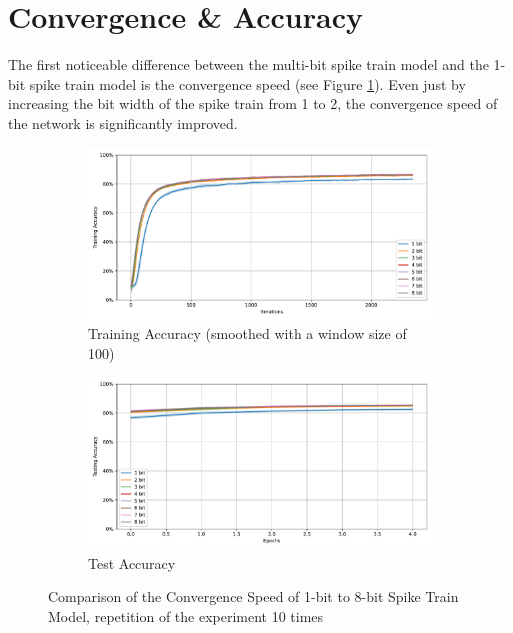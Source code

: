 
    \section{Convergence \& Accuracy}
    \label{sec:convergence_accuracy}
        The first noticeable difference between the multi-bit spike train model and the 1-bit spike train model is the convergence speed (see Figure \ref{fig:convergence_speed}). Even just by increasing the bit width of the spike train from 1 to 2, the convergence speed of the network is significantly improved. 
        \begin{figure}[!htpb]
            \centering
            \begin{subfigure}[H]{\textwidth}
                \centering
                \includegraphics[width=\textwidth]{../standard/FashionMNIST/plots/fashionmnist_train_acc.pdf}
                \caption{Training Accuracy (smoothed with a window size of 100)}
            \end{subfigure}
            \hfill
            \begin{subfigure}[H]{\textwidth}
                \centering
                \includegraphics[width=\textwidth]{../standard/FashionMNIST/plots/fashionmnist_test_acc.pdf}
                \caption{Test Accuracy}
            \end{subfigure}
            \caption{Comparison of the Convergence Speed of 1-bit to 8-bit Spike Train Model, repetition of the experiment 10 times}
            \label{fig:convergence_speed}
        \end{figure}

